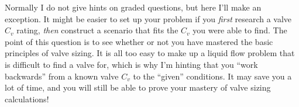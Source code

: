 \eject






Normally I do not give hints on graded questions, but here I'll make an exception.  It might be easier to set up your problem if you {\it first} research a valve $C_v$ rating, {\it then} construct a scenario that fits the $C_v$ you were able to find.  The point of this question is to see whether or not you have mastered the basic principles of valve sizing.  It is all too easy to make up a liquid flow problem that is difficult to find a valve for, which is why I'm hinting that you ``work backwards'' from a known valve $C_v$ to the ``given'' conditions.  It may save you a lot of time, and you will still be able to prove your mastery of valve sizing calculations!











